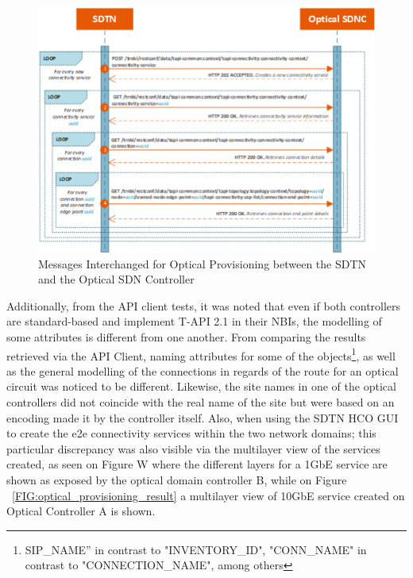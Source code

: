 \documentclass[a4paper,fleqn]{cas-dc}
\begin{document}
\begin{figure}
	\centering
		\includegraphics[width=\linewidth]{figs/optical_provisioning_workflow_2.png}
	\caption{Messages Interchanged for Optical Provisioning between the SDTN and the Optical SDN Controller}
	\label{FIG:optical_provisioning_workflow}
\end{figure}

Additionally, from the API client tests, it was noted that even if both controllers are standard-based and implement T-API 2.1 in their NBIs, the modelling of some attributes is different from one another. From comparing the results retrieved via the API Client, naming attributes for some of the objects\footnote{SIP\_NAME” in contrast to "INVENTORY\_ID", "CONN\_NAME" in contrast to "CONNECTION\_NAME", among others}, as well as the general modelling of the connections in regards of the route for an optical circuit was noticed to be different. Likewise, the site names in one of the optical controllers did not coincide with the real name of the site but were based on an encoding made it by the controller itself. Also, when using the SDTN HCO GUI to create the e2e connectivity services within the two network domains; this particular discrepancy was also visible via the multilayer view of the services created, as seen on Figure W where the different layers for a 1GbE service are shown as exposed by the optical domain controller B, while on Figure ~\ref{FIG:optical_provisioning_result} a multilayer view of 10GbE service created on Optical Controller A is shown.
\end{document}
